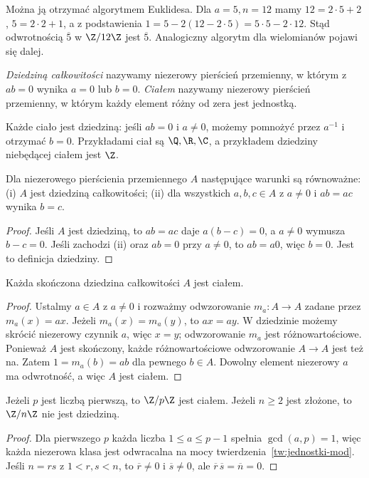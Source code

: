\begin{uwaga}
Można ją otrzymać algorytmem Euklidesa. Dla $a=5,n=12$ mamy
$12=2\cdot5+2$, $5=2\cdot2+1$, a z podstawienia
$1=5-2(12-2\cdot5)=5\cdot5-2\cdot12$.
Stąd odwrotnością $\overline5$ w $\Z/12\Z$ jest $\overline5$.
Analogiczny algorytm dla wielomianów pojawi się dalej.
\end{uwaga}

\begin{definicja}
\label{def:dziedzina-cialo}
\emph{Dziedziną całkowitości} nazywamy niezerowy pierścień przemienny,
w którym z $ab=0$ wynika $a=0$ lub $b=0$.
\emph{Ciałem} nazywamy niezerowy pierścień przemienny,
w którym każdy element różny od zera jest jednostką.
\end{definicja}

Każde ciało jest dziedziną: jeśli $ab=0$ i $a\ne0$, możemy pomnożyć
przez $a^{-1}$ i otrzymać $b=0$. Przykładami ciał są $\Q,\R,\C$,
a przykładem dziedziny niebędącej ciałem jest $\Z$.

\begin{stwierdzenie}
Dla niezerowego pierścienia przemiennego $A$ następujące warunki są
równoważne: (i) $A$ jest dziedziną całkowitości;
(ii) dla wszystkich $a,b,c\in A$ z $a\ne0$ i $ab=ac$ wynika $b=c$.
\end{stwierdzenie}
\begin{proof}
Jeśli $A$ jest dziedziną, to $ab=ac$ daje $a(b-c)=0$,
a $a\ne0$ wymusza $b-c=0$. Jeśli zachodzi (ii) oraz $ab=0$ przy $a\ne0$,
to $ab=a0$, więc $b=0$. Jest to definicja dziedziny.
\end{proof}

\begin{twierdzenie}
\label{tw:skonczona}
Każda skończona dziedzina całkowitości $A$ jest ciałem.
\end{twierdzenie}
\begin{proof}
Ustalmy $a\in A$ z $a\ne0$ i rozważmy odwzorowanie
$m_a\colon A\to A$ zadane przez $m_a(x)=ax$.
Jeżeli $m_a(x)=m_a(y)$, to $ax=ay$. W dziedzinie możemy skrócić
niezerowy czynnik $a$, więc $x=y$; odwzorowanie $m_a$ jest różnowartościowe.
Ponieważ $A$ jest skończony, każde różnowartościowe odwzorowanie $A\to A$
jest też na. Zatem $1=m_a(b)=ab$ dla pewnego $b\in A$.
Dowolny element niezerowy $a$ ma odwrotność, a więc $A$ jest ciałem.
\end{proof}

\begin{wniosek}
Jeżeli $p$ jest liczbą pierwszą, to $\Z/p\Z$ jest ciałem.
Jeżeli $n\ge2$ jest złożone, to $\Z/n\Z$ nie jest dziedziną.
\end{wniosek}
\begin{proof}
Dla pierwszego $p$ każda liczba $1\le a\le p-1$ spełnia
$\gcd(a,p)=1$, więc każda niezerowa klasa jest odwracalna
na mocy twierdzenia~\ref{tw:jednostki-mod}.
Jeśli $n=rs$ z $1<r,s<n$, to
$\overline r\ne0$ i $\overline s\ne0$, ale
$\overline r\,\overline s=\overline n=0$.
\end{proof}


